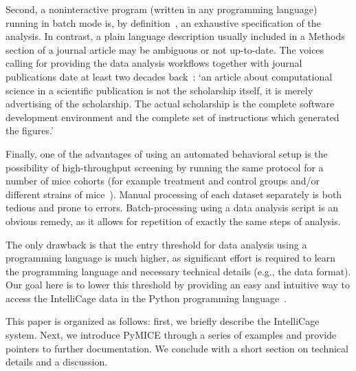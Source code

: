 Second, a noninteractive program (written in any programming language)
running in batch mode is, by
definition~\cite{Hoare69anaxiomatic,Turing1936,Floyd1967Flowcharts,Mccarthy63abasis},
an exhaustive specification of the analysis. In contrast, a plain language
description usually included in a Methods section of a journal article
may be ambiguous or not up-to-date.
The voices calling for providing the data analysis workflows together with
journal publications date at least two decades back~\cite{buckheit1995}:
`an article about computational science in a scientific publication is not
the scholarship itself, it is merely advertising of the scholarship. The
actual scholarship is the complete software development environment and the
complete set of instructions which generated the figures.'

Finally, one of the advantages of using an automated behavioral setup
is the possibility of high-throughput screening
by running the same protocol for a number of mice
cohorts (for example treatment and control groups and/or different strains
of mice~\cite{Puscian:2014cu}). Manual processing of each dataset separately
is both tedious and prone to errors. Batch-processing using a data
analysis script is an obvious remedy, as it allows for repetition of exactly
the same steps of analysis.

The only drawback is that the entry threshold for data analysis using a
programming language is much higher, as significant effort is required to
learn the programming language and necessary technical details (e.g., the data
format).
Our goal here is to lower this threshold by providing an easy and intuitive
way to access the IntelliCage data in the Python programming language~\cite{rossum1995}.

This paper is organized as follows: first, we briefly describe the IntelliCage system.
Next, we introduce PyMICE through a series of examples and provide pointers
to further documentation. We conclude with a short section on technical details and
a discussion.
